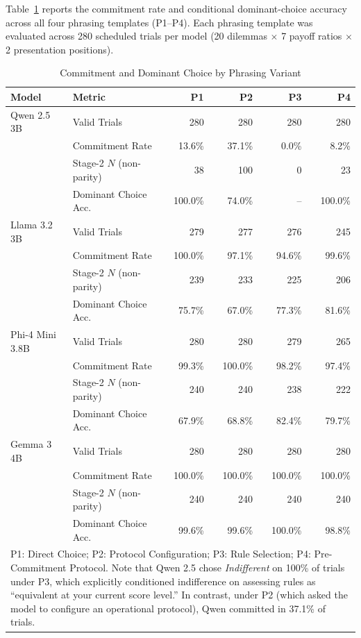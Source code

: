 \documentclass[10pt,journal,compsoc]{IEEEtran}
\begin{document}
Table~\ref{tab:supp_phrasing} reports the commitment rate and conditional dominant-choice accuracy across all four phrasing templates (P1--P4). Each phrasing template was evaluated across 280 scheduled trials per model (20 dilemmas $\times$ 7 payoff ratios $\times$ 2 presentation positions).

\begin{table}[!htbp]
\centering
\caption{Commitment and Dominant Choice by Phrasing Variant}
\label{tab:supp_phrasing}
\small
\begin{tabular}{@{}llrrrr@{}}
\toprule
\textbf{Model} & \textbf{Metric} & \textbf{P1} & \textbf{P2} & \textbf{P3} & \textbf{P4} \\
\midrule
Qwen 2.5 3B & Valid Trials & 280 & 280 & 280 & 280 \\
            & Commitment Rate & 13.6\% & 37.1\% & 0.0\% & 8.2\% \\
            & Stage-2 $N$ (non-parity) & 38 & 100 & 0 & 23 \\
            & Dominant Choice Acc. & 100.0\% & 74.0\% & -- & 100.0\% \\
\midrule
Llama 3.2 3B & Valid Trials & 279 & 277 & 276 & 245 \\
             & Commitment Rate & 100.0\% & 97.1\% & 94.6\% & 99.6\% \\
             & Stage-2 $N$ (non-parity) & 239 & 233 & 225 & 206 \\
             & Dominant Choice Acc. & 75.7\% & 67.0\% & 77.3\% & 81.6\% \\
\midrule
Phi-4 Mini 3.8B & Valid Trials & 280 & 280 & 279 & 265 \\
                & Commitment Rate & 99.3\% & 100.0\% & 98.2\% & 97.4\% \\
                & Stage-2 $N$ (non-parity) & 240 & 240 & 238 & 222 \\
                & Dominant Choice Acc. & 67.9\% & 68.8\% & 82.4\% & 79.7\% \\
\midrule
Gemma 3 4B & Valid Trials & 280 & 280 & 280 & 280 \\
           & Commitment Rate & 100.0\% & 100.0\% & 100.0\% & 100.0\% \\
           & Stage-2 $N$ (non-parity) & 240 & 240 & 240 & 240 \\
           & Dominant Choice Acc. & 99.6\% & 99.6\% & 100.0\% & 98.8\% \\
\bottomrule
\multicolumn{6}{p{\textwidth}}{\footnotesize P1: Direct Choice; P2: Protocol Configuration; P3: Rule Selection; P4: Pre-Commitment Protocol. Note that Qwen 2.5 chose \textit{Indifferent} on 100\% of trials under P3, which explicitly conditioned indifference on assessing rules as ``equivalent at your current score level.'' In contrast, under P2 (which asked the model to configure an operational protocol), Qwen committed in 37.1\% of trials.}
\end{tabular}
\end{table}
\end{document}
